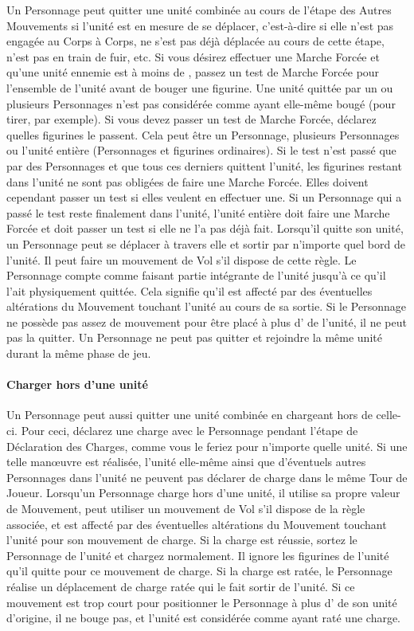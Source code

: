 Un Personnage peut quitter une unité combinée au cours de l'étape des Autres Mouvements si l'unité est en mesure de se déplacer, c'est-à-dire si elle n'est pas engagée au Corps à Corps, ne s'est pas déjà déplacée au cours de cette étape, n'est pas en train de fuir, etc. Si vous désirez effectuer une Marche Forcée et qu'une unité ennemie est à moins de , passez un test de Marche Forcée pour l'ensemble de l'unité avant de bouger une figurine. Une unité quittée par un ou plusieurs Personnages n'est pas considérée comme ayant elle-même bougé (pour tirer, par exemple). Si vous devez passer un test de Marche Forcée, déclarez quelles figurines le passent. Cela peut être un Personnage, plusieurs Personnages ou l'unité entière (Personnages et figurines ordinaires). Si le test n'est passé que par des Personnages et que tous ces derniers quittent l'unité, les figurines restant dans l'unité ne sont pas obligées de faire une Marche Forcée. Elles doivent cependant passer un test si elles veulent en effectuer une. Si un Personnage qui a passé le test reste finalement dans l'unité, l'unité entière doit faire une Marche Forcée et doit passer un test si elle ne l'a pas déjà fait. Lorsqu'il quitte son unité, un Personnage peut se déplacer à travers elle et sortir par n'importe quel bord de l'unité. Il peut faire un mouvement de Vol s'il dispose de cette règle. Le Personnage compte comme faisant partie intégrante de l'unité jusqu'à ce qu'il l'ait physiquement quittée. Cela signifie qu'il est affecté par des éventuelles altérations du Mouvement touchant l'unité au cours de sa sortie. Si le Personnage ne possède pas assez de mouvement pour être placé à plus d' de l'unité, il ne peut pas la quitter. Un Personnage ne peut pas quitter et rejoindre la même unité durant la même phase de jeu.

\paragraph{Charger hors d'une unité}

Un Personnage peut aussi quitter une unité combinée en chargeant hors de celle-ci. Pour ceci, déclarez une charge avec le Personnage pendant l'étape de Déclaration des Charges, comme vous le feriez pour n'importe quelle unité. Si une telle manœuvre est réalisée, l'unité elle-même ainsi que d'éventuels autres Personnages dans l'unité ne peuvent pas déclarer de charge dans le même Tour de Joueur.  Lorsqu'un Personnage charge hors d'une unité, il utilise sa propre valeur de Mouvement, peut utiliser un mouvement de Vol s'il dispose de la règle associée, et est affecté par des éventuelles altérations du Mouvement touchant l'unité pour son mouvement de charge. Si la charge est réussie, sortez le Personnage de l'unité et chargez normalement. Il ignore les figurines de l'unité qu'il quitte pour ce mouvement de charge. Si la charge est ratée, le Personnage réalise un déplacement de charge ratée qui le fait sortir de l'unité. Si ce mouvement est trop court pour positionner le Personnage à plus d' de son unité d'origine, il ne bouge pas, et l'unité est considérée comme ayant raté une charge.

